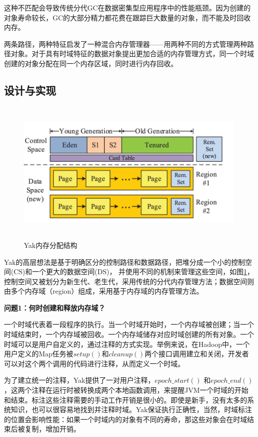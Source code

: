 这种不匹配会导致传统分代GC在数据密集型应用程序中的性能瓶颈。因为创建的对象寿命较长，GC的大部分精力都花费在跟踪巨大数量的对象，而不能及时回收内存。 

两条路径，两种特征启发了一种混合内存管理器——用两种不同的方式管理两种路径对象。对于具有时域特征的数据对象提出更加合适的内存管理方式，同一个时域创建的对象分配在同一个内存区域，同时进行内存回收。

\subsection{设计与实现}
\begin{figure}[h]
    \centering
    \includegraphics[width=12cm,height=7cm]{figure/layout.png}
    \caption{
       Yak内存分配结构
    }
    \label{img3}
\end{figure}
Yak的高层想法是基于明确区分的控制路径和数据路径，把堆分成一个小的控制空间(CS)和一个更大的数据空间(DS)， 并使用不同的机制来管理这些空间，如图\ref{img3}，控制空间又被划分为新生代、老生代，采用传统的分代内存管理方法；数据空间则由多个内存域（region）组成，采用基于内存域的内存管理方法。

{\bfseries 问题1：何时创建和释放内存域？}

一个时域代表着一段程序的执行。当一个时域开始时，一个内存域被创建；当一个时域结束时，一个内存域被回收。一个内存域储存对应时域创建的所有对象。一个时域可以是用户自定义的，通过注释的方式实现。举例来说，在Hadoop中，一个用户定义的Map任务被$setup()$和$cleanup()$两个接口调用建立和关闭，开发者可以对这个两个调用的代码进行注释，从而定义一个时域。

为了建立统一的注释，Yak提供了一对用户注释，$epoch\_start()$ 和$epoch\_end()$，这两个注释在运行时被转换成两个本地函数调用，来提醒JVM一个时域的开始和结束。标注这些注释需要的手动工作开销是很小的。即使是新手，没有太多的系统知识，也可以很容易地找到并注释时域。Yak保证执行正确性，当然，时域标注的位置会影响性能：如果一个时域内的对象有不同的寿命，那这些对象会在时域结束后被复制，增加开销。

